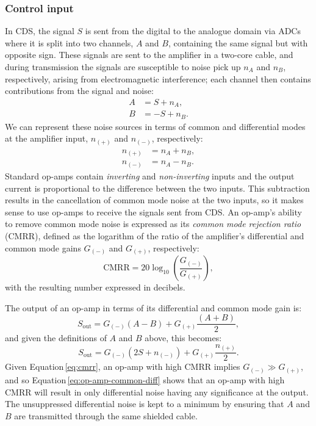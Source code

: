 \subsubsection{Control input}
In \gls{CDS}, the signal $S$ is sent from the digital to the analogue domain via \glspl{ADC} where it is split into two channels, $A$ and $B$, containing the same signal but with opposite sign. These signals are sent to the amplifier in a two-core cable, and during transmission the signals are susceptible to noise pick up $n_{A}$ and $n_{B}$, respectively, arising from electromagnetic interference; each channel then contains contributions from the signal and noise:
\begin{align}
  A &= S + n_{A}, \\
  B &= -S + n_{B}.
\end{align}
We can represent these noise sources in terms of common and differential modes at the amplifier input, $n_{\left(+\right)}$ and $n_{\left(-\right)}$, respectively:
\begin{align}
  n_{\left(+\right)} &= n_{A} + n_{B}, \\
  n_{\left(-\right)} &= n_{A} - n_{B}.
\end{align}
Standard op-amps contain \emph{inverting} and \emph{non-inverting} inputs and the output current is proportional to the difference between the two inputs. This subtraction results in the cancellation of common mode noise at the two inputs, so it makes sense to use op-amps to receive the signals sent from \gls{CDS}. An op-amp's ability to remove common mode noise is expressed as its \emph{common mode rejection ratio} (\gls{CMRR}), defined as the logarithm of the ratio of the amplifier's differential and common mode gains $G_{\left( - \right)}$ and $G_{\left( + \right)}$, respectively:
\begin{equation}
  \label{eq:cmrr}
  \text{CMRR} = 20 \log_{10} \left( \frac{G_{\left(-\right)}}{G_{\left(+\right)}} \right),
\end{equation}
with the resulting number expressed in decibels.

The output of an op-amp in terms of its differential and common mode gain is:
\begin{equation}
  S_{\text{out}} = G_{\left(-\right)} \left(A - B\right) + G_{\left(+\right)} \frac{\left(A + B\right)}{2},
\end{equation}
and given the definitions of $A$ and $B$ above, this becomes:
\begin{equation}
  \label{eq:op-amp-common-diff}
  S_{\text{out}} = G_{\left(-\right)} \left(2S + n_{\left(-\right)}\right) + G_{\left(+\right)} \frac{n_{\left(+\right)}}{2}.
\end{equation}
Given Equation\,\ref{eq:cmrr}, an op-amp with high \gls{CMRR} implies $G_{\left(-\right)} \gg G_{\left(+\right)}$, and so Equation\,\ref{eq:op-amp-common-diff} shows that an op-amp with high \gls{CMRR} will result in only differential noise having any significance at the output. The unsuppressed differential noise is kept to a minimum by ensuring that $A$ and $B$ are transmitted through the same shielded cable.

